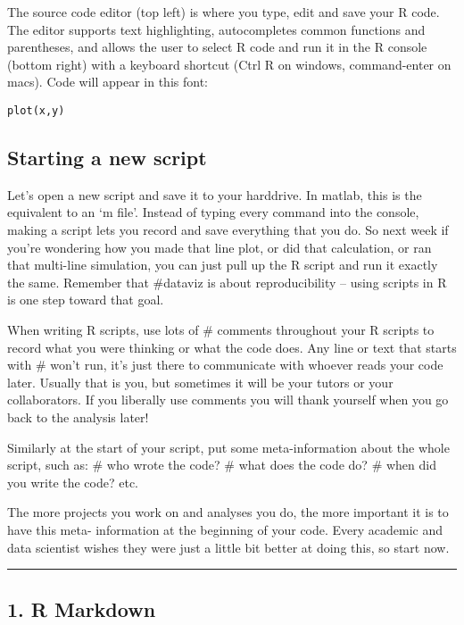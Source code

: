 \documentclass[]{article}
\begin{document}
The source code editor (top left) is where you type, edit and save your
R code. The editor supports text highlighting, autocompletes common
functions and parentheses, and allows the user to select R code and run
it in the R console (bottom right) with a keyboard shortcut (Ctrl R on
windows, command-enter on macs). Code will appear in this font:

\begin{verbatim}
plot(x,y)
\end{verbatim}

\hypertarget{starting-a-new-script}{%
\subsection{Starting a new script}\label{starting-a-new-script}}

Let's open a new script and save it to your harddrive. In matlab, this
is the equivalent to an `m file'. Instead of typing every command into
the console, making a script lets you record and save everything that
you do. So next week if you're wondering how you made that line plot, or
did that calculation, or ran that multi-line simulation, you can just
pull up the R script and run it exactly the same. Remember that
\#dataviz is about reproducibility -- using scripts in R is one step
toward that goal.

When writing R scripts, use lots of \# comments throughout your R
scripts to record what you were thinking or what the code does. Any line
or text that starts with \# won't run, it's just there to communicate
with whoever reads your code later. Usually that is you, but sometimes
it will be your tutors or your collaborators. If you liberally use
comments you will thank yourself when you go back to the analysis later!

Similarly at the start of your script, put some meta-information about
the whole script, such as: \# who wrote the code? \# what does the code
do? \# when did you write the code? etc.

The more projects you work on and analyses you do, the more important it
is to have this meta- information at the beginning of your code. Every
academic and data scientist wishes they were just a little bit better at
doing this, so start now.

\begin{center}\rule{0.5\linewidth}{\linethickness}\end{center}

\hypertarget{r-markdown}{%
\subsection{1. R Markdown}\label{r-markdown}}
\end{document}
